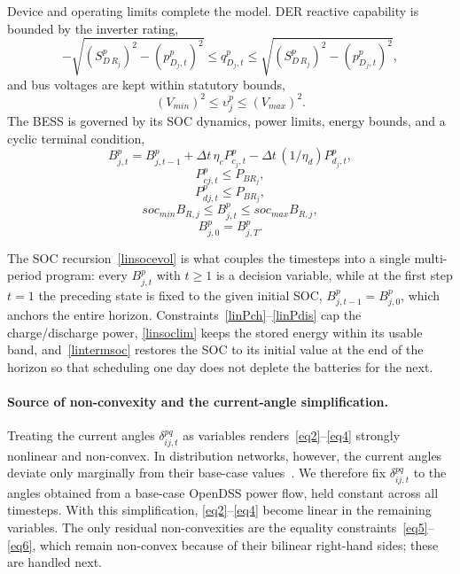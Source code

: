Device and operating limits complete the model. DER reactive capability
is bounded by the inverter rating,
\begin{equation}\label{linqder}
{ - \sqrt {{{\left( {S_{D\,R_j}^p} \right)}^2} - {{\left( {p_{D_j,t}^p} \right)}^2}} \le q_{D_j,t}^p \le \sqrt {{{\left( {S_{D\,R_j}^p} \right)}^2} - {{\left( {p_{D_j,t}^p} \right)}^2}}},
\end{equation}
and bus voltages are kept within statutory bounds,
\begin{equation}\label{linv}
{\left( {{V_{min}}} \right)^2} \le {\upsilon}_j^p \le {\left( {{V_{max}}} \right)^2}.
\end{equation}
The BESS is governed by its SOC dynamics, power limits, energy bounds,
and a cyclic terminal condition,
\begin{equation}\label{linsocevol}
B_{j,t}^{p} = B_{j,t-1}^{p} + \Delta t\, \eta_c P_{c_j,t}^{p} - \Delta t\, (1/\eta_d) P_{d_j,t}^{p},
\end{equation}
\begin{equation}\label{linPch}
P_{cj,t}^{p} \le P_{BR_j},
\end{equation}
\begin{equation}\label{linPdis}
P_{dj,t}^{p} \le P_{BR_j},
\end{equation}
\begin{equation} \label{linsoclim}
soc_{min}B_{R,j} \le B_{j,t}^p \le  soc_{max}B_{R,j},
\end{equation}
\begin{equation}\label{lintermsoc}
B_{j,0}^{p} = B_{j,T}^{p}.
\end{equation}

The SOC recursion~\eqref{linsocevol} is what couples the timesteps into
a single multi-period program: every $B^{p}_{j,t}$ with $t\ge 1$ is a
decision variable, while at the first step $t=1$ the preceding state is
fixed to the given initial SOC, $B^{p}_{j,t-1}=B^{p}_{j,0}$, which
anchors the entire horizon. Constraints~\eqref{linPch}--\eqref{linPdis}
cap the charge/discharge power, \eqref{linsoclim} keeps the stored
energy within its usable band, and~\eqref{lintermsoc} restores the SOC
to its initial value at the end of the horizon so that scheduling one
day does not deplete the batteries for the next.

\paragraph*{Source of non-convexity and the current-angle
simplification.} Treating the current angles $\delta^{pq}_{ij,t}$ as
variables renders~\eqref{eq2}--\eqref{eq4} strongly nonlinear and
non-convex. In distribution networks, however, the current angles
deviate only marginally from their base-case values~\cite{XX}. We
therefore fix $\delta^{pq}_{ij,t}$ to the angles obtained from a
base-case OpenDSS power flow, held constant across all timesteps. With
this simplification, \eqref{eq2}--\eqref{eq4} become linear in the
remaining variables. The only residual non-convexities are the equality
constraints~\eqref{eq5}--\eqref{eq6}, which remain non-convex because of
their bilinear right-hand sides; these are handled next.

